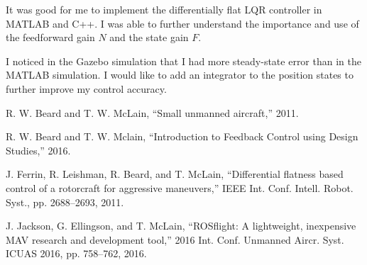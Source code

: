 \documentclass[12pt]{article}
\begin{document}
It was good for me to implement the differentially flat LQR controller in MATLAB and C++. I was able to further understand the importance and use of the feedforward gain  $N$ and the state gain $F$.

I noticed in the Gazebo simulation that I had more steady-state error than in the MATLAB simulation. I would like to add an integrator to the position states to further improve my control accuracy.

\begin{thebibliography}{9}
\singlespace

 R. W. Beard and T. W. McLain, “Small unmanned aircraft,” 2011.

 R. W. Beard and T. W. Mclain, “Introduction to Feedback Control using Design Studies,” 2016.

 J. Ferrin, R. Leishman, R. Beard, and T. McLain, “Differential flatness based control of a rotorcraft for aggressive maneuvers,” IEEE Int. Conf. Intell. Robot. Syst., pp. 2688–2693, 2011.

 J. Jackson, G. Ellingson, and T. McLain, “ROSflight: A lightweight, inexpensive MAV research and development tool,” 2016 Int. Conf. Unmanned Aircr. Syst. ICUAS 2016, pp. 758–762, 2016.

\end{thebibliography}
\end{document}
